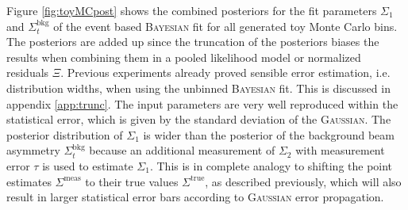Figure \ref{fig:toyMCpost} shows the combined posteriors for the fit parameters $\Sigma_1$ and $\Sigma_t^\text{bkg}$ of the event based \textsc{Bayesian} fit for all generated toy Monte Carlo bins. The posteriors are added up since the truncation of the posteriors biases the results when combining them in a pooled likelihood model or normalized residuals $\Xi$. Previous experiments already proved sensible error estimation, i.e. distribution widths, when using the unbinned \textsc{Bayesian} fit. This is discussed in appendix \ref{app:trunc}. The input parameters are very well reproduced within the statistical error, which is given by the standard deviation of the \textsc{Gaussian}. The posterior distribution of $\Sigma_1$ is wider than the posterior of the background beam asymmetry $\Sigma_t^\text{bkg}$ because an additional measurement of $\Sigma_2$ with measurement error $\tau$ is used to estimate $\Sigma_1$. This is in complete analogy to shifting the point estimates $\Sigma^\text{meas}$ to their true values $\Sigma^\text{true}$, as described previously, which will also result in larger statistical error bars according to \textsc{Gaussian} error propagation.
